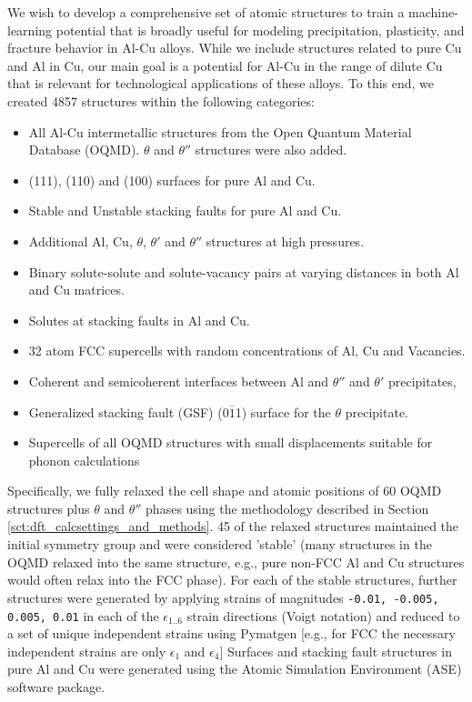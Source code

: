 \documentclass{article}
\begin{document}
We wish to develop a comprehensive set of atomic structures to train a machine-learning potential that is broadly useful for modeling precipitation, plasticity, and fracture behavior in Al-Cu alloys.  While we include structures related to pure Cu and Al in Cu, our main goal is a potential for Al-Cu in the range of dilute Cu that is relevant for technological applications of these alloys.  To this end, we created 4857 structures within the following categories:
\begin{itemize}
    \item All Al-Cu intermetallic structures from the Open Quantum Material Database (OQMD)\cite{Kirklin2015}. $\theta$ and $\theta''$ structures were also added. 
    \item (111), (110) and (100) surfaces for pure Al and Cu.
    \item Stable and Unstable stacking faults for pure Al and Cu. 
    \item Additional Al, Cu, $\theta$, $\theta'$ and $\theta''$ structures at high pressures. 
    \item Binary solute-solute and solute-vacancy pairs at varying distances in both Al and Cu matrices.
    \item Solutes at stacking faults in Al and Cu. 
    \item 32 atom FCC supercells with random concentrations of Al, Cu and Vacancies. 
    \item Coherent and semicoherent interfaces between Al and $\theta''$  and $\theta'$ precipitates, 
    \item Generalized stacking fault (GSF) (0$\overline{1}$1) surface for the $\theta$ precipitate. 
    \item Supercells of all OQMD structures with small displacements suitable for phonon calculations
\end{itemize}

Specifically, we fully relaxed the cell shape and atomic positions of 60 OQMD structures plus $\theta$ and $\theta''$ phases using the methodology described in Section \ref{sct:dft_calcsettings_and_methods}.  45 of the relaxed structures maintained the initial symmetry group and were considered 'stable' (many structures in the OQMD relaxed into the same structure, e.g., pure non-FCC Al and Cu structures would often relax into the FCC phase).
For each of the stable structures, further structures were generated by applying strains of magnitudes \texttt{-0.01, -0.005, 0.005, 0.01} in each of the $\epsilon_{1..6}$ strain directions (Voigt notation) and reduced to a set of unique independent strains using Pymatgen\cite{Ong2013} [e.g., for FCC the necessary independent strains are only $\epsilon_1$ and $\epsilon_4$]
Surfaces and stacking fault structures in pure Al and Cu were generated using the Atomic Simulation Environment (ASE) software package.
\end{document}
